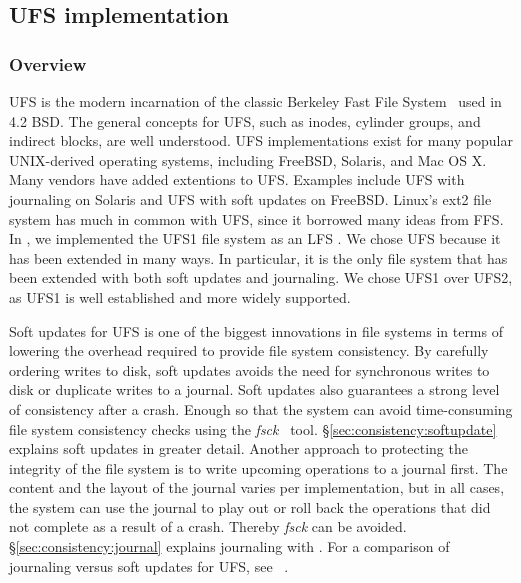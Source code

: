 \subsection{UFS implementation}
\label{sec:modules:ufs}

\subsubsection {Overview}
UFS is the modern incarnation of the classic Berkeley Fast File
System~\cite{mckusick84fast} used in 4.2 BSD. The general concepts for UFS, such
as inodes, cylinder groups, and indirect blocks, are well understood. UFS
implementations exist for many popular UNIX-derived operating systems, including
FreeBSD, Solaris, and Mac OS X. Many vendors have added extentions to UFS.
Examples include UFS with journaling on Solaris and UFS with soft updates on
FreeBSD. Linux's ext2 file system has much in common with UFS, since it borrowed
many ideas from FFS. In \Kudos, we implemented the UFS1 file system as an LFS
\module. We chose UFS because it has been extended in many ways. In particular,
it is the only file system that has been extended with both soft updates and
journaling. We chose UFS1 over UFS2, as UFS1 is well established and more widely
supported.

Soft updates for UFS is one of the biggest innovations in file systems in terms
of lowering the overhead required to provide file system consistency. By
carefully ordering writes to disk, soft updates avoids the need for synchronous
writes to disk or duplicate writes to a journal. Soft updates also guarantees
a strong level of consistency after a crash. Enough so that the system can
avoid time-consuming file system consistency checks using the
\emph{fsck}~\cite{mckusick94fsck} tool. \S\ref{sec:consistency:softupdate}
explains soft updates in greater detail.
Another approach to protecting the integrity of the file system is to write
upcoming operations to a journal first. The content and the layout of the
journal varies per implementation, but in all cases, the system can use the
journal to play out or roll back the operations that did not complete as a
result of a crash. Thereby \emph{fsck} can be avoided.
\S\ref{sec:consistency:journal} explains journaling with \chdescs. For a
comparison of journaling versus soft updates for UFS, see
~\cite{seltzer00journaling}.

